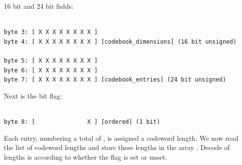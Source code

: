 16 bit  and 24 bit  fields:

\begin{Verbatim}[commandchars=\\\{\}]

byte 3: [ X X X X X X X X ]
byte 4: [ X X X X X X X X ] [codebook_dimensions] (16 bit unsigned)

byte 5: [ X X X X X X X X ]
byte 6: [ X X X X X X X X ]
byte 7: [ X X X X X X X X ] [codebook_entries] (24 bit unsigned)

\end{Verbatim}

Next is the \varname{[ordered]} bit flag:

\begin{Verbatim}[commandchars=\\\{\}]

byte 8: [               X ] [ordered] (1 bit)

\end{Verbatim}

Each entry, numbering a
total of , is assigned a codeword length.
We now read the list of codeword lengths and store these lengths in
the array . Decode of lengths is
according to whether the \varname{[ordered]} flag is set or unset.

